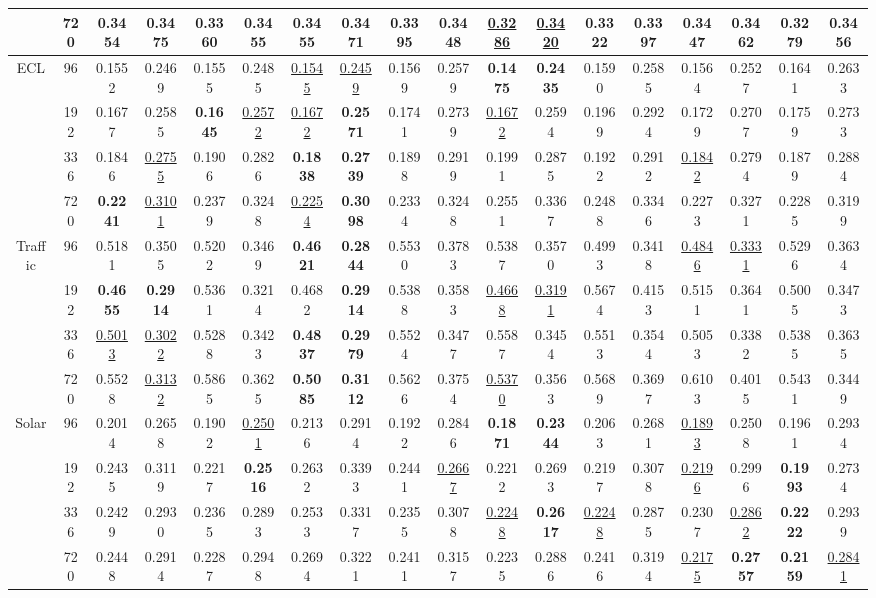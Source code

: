 \begin{table}[htbp]
{\begin{tabular}{@{}cc*{16}{c}@{}}
 & 720 & 0.3454 & 0.3475 & 0.3360 & 0.3455 & 0.3455 & 0.3471 & 0.3395 & 0.3448 & \underline{0.3286} & \underline{0.3420} & 0.3322 & \textbf{0.3397} & 0.3447 & 0.3462 & \textbf{0.3279} & 0.3456 \\
\midrule
\multirow{4}{*}{ECL} & 96 & 0.1552 & 0.2469 & 0.1555 & 0.2485 & \underline{0.1545} & \underline{0.2459} & 0.1569 & 0.2579 & \textbf{0.1475} & \textbf{0.2435} & 0.1590 & 0.2585 & 0.1564 & 0.2527 & 0.1641 & 0.2633 \\
 & 192 & 0.1677 & 0.2585 & \textbf{0.1645} & \underline{0.2572} & \underline{0.1672} & \textbf{0.2571} & 0.1741 & 0.2739 & \underline{0.1672} & 0.2594 & 0.1969 & 0.2924 & 0.1729 & 0.2707 & 0.1759 & 0.2733 \\
 & 336 & 0.1846 & \underline{0.2755} & 0.1906 & 0.2826 & \textbf{0.1838} & \textbf{0.2739} & 0.1898 & 0.2919 & 0.1991 & 0.2875 & 0.1922 & 0.2912 & \underline{0.1842} & 0.2794 & 0.1879 & 0.2884 \\
 & 720 & \textbf{0.2241} & \underline{0.3101} & 0.2379 & 0.3248 & \underline{0.2254} & \textbf{0.3098} & 0.2334 & 0.3248 & 0.2551 & 0.3367 & 0.2488 & 0.3346 & 0.2273 & 0.3271 & 0.2285 & 0.3199 \\
\midrule
\multirow{4}{*}{Traffic} & 96 & 0.5181 & 0.3505 & 0.5202 & 0.3469 & \textbf{0.4621} & \textbf{0.2844} & 0.5530 & 0.3783 & 0.5387 & 0.3570 & 0.4993 & 0.3418 & \underline{0.4846} & \underline{0.3331} & 0.5296 & 0.3634 \\
 & 192 & \textbf{0.4655} & \textbf{0.2914} & 0.5361 & 0.3214 & 0.4682 & \textbf{0.2914} & 0.5388 & 0.3583 & \underline{0.4668} & \underline{0.3191} & 0.5674 & 0.4153 & 0.5151 & 0.3641 & 0.5005 & 0.3473 \\
 & 336 & \underline{0.5013} & \underline{0.3022} & 0.5288 & 0.3423 & \textbf{0.4837} & \textbf{0.2979} & 0.5524 & 0.3477 & 0.5587 & 0.3454 & 0.5513 & 0.3544 & 0.5053 & 0.3382 & 0.5385 & 0.3635 \\
 & 720 & 0.5528 & \underline{0.3132} & 0.5865 & 0.3625 & \textbf{0.5085} & \textbf{0.3112} & 0.5626 & 0.3754 & \underline{0.5370} & 0.3563 & 0.5689 & 0.3697 & 0.6103 & 0.4015 & 0.5431 & 0.3449 \\
\midrule
\multirow{4}{*}{Solar} & 96 & 0.2014 & 0.2658 & 0.1902 & \underline{0.2501} & 0.2136 & 0.2914 & 0.1922 & 0.2846 & \textbf{0.1871} & \textbf{0.2344} & 0.2063 & 0.2681 & \underline{0.1893} & 0.2508 & 0.1961 & 0.2934 \\
 & 192 & 0.2435 & 0.3119 & 0.2217 & \textbf{0.2516} & 0.2632 & 0.3393 & 0.2441 & \underline{0.2667} & 0.2212 & 0.2693 & 0.2197 & 0.3078 & \underline{0.2196} & 0.2996 & \textbf{0.1993} & 0.2734 \\
 & 336 & 0.2429 & 0.2930 & 0.2365 & 0.2893 & 0.2533 & 0.3317 & 0.2355 & 0.3078 & \underline{0.2248} & \textbf{0.2617} & \underline{0.2248} & 0.2875 & 0.2307 & \underline{0.2862} & \textbf{0.2222} & 0.2939 \\
 & 720 & 0.2448 & 0.2914 & 0.2287 & 0.2948 & 0.2694 & 0.3221 & 0.2411 & 0.3157 & 0.2235 & 0.2886 & 0.2416 & 0.3194 & \underline{0.2175} & \textbf{0.2757} & \textbf{0.2159} & \underline{0.2841} \\
\bottomrule
\end{tabular}}
\end{table}
